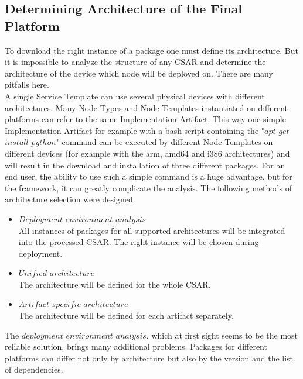\subsection{Determining Architecture of the Final Platform} \label{finplatf}
To download the right instance of a package one must define its architecture.
But it is impossible to analyze the structure of any CSAR and determine the architecture of the device which node will be deployed on.
There are many pitfalls here.\\
A single Service Template can use several physical devices with different architectures.
Many Node Types and Node Templates instantiated on different platforms can refer to the same Implementation Artifact.
This way one simple Implementation Artifact for example with a bash script containing the "$apt$-$get$ $install$ $python$" command can be executed by different Node Templates on different devices (for example with the arm, amd64 and i386 architectures) and will result in the download and installation of three different packages. 
For an end user, the ability to use such a simple command is a huge advantage, but for the framework, it can greatly complicate the analysis.
The following methods of architecture selection were designed.
\begin{itemize}
	\item $Deployment$ $environment$ $analysis$\\
	All  instances of packages for all supported architectures will be integrated into the processed CSAR. 
	The right instance will be chosen during deployment.
	\item $Unified$ $architecture$\\
	The architecture will be defined for the whole CSAR.
	\item $Artifact$ $specific$ $architecture$\\
	The architecture will be defined for each artifact separately.
\end{itemize}
The $deployment$ $environment$ $analysis$, which at first sight seems to be the most reliable solution, brings many additional problems.
Packages for different platforms can differ not only by architecture but also by the version and the list of dependencies.
